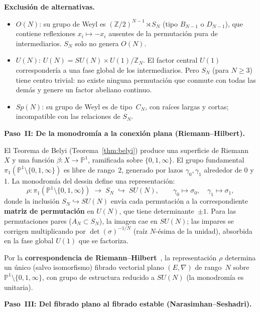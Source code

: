 \documentclass[11pt, a4paper, openany]{book}
\begin{document}
\smallskip\noindent
\textbf{Exclusi\'on de alternativas.}
\begin{itemize}
  \item $O(N)$: su grupo de Weyl es $(\mathbb{Z}/2)^{N-1} \rtimes S_N$
    (tipo $B_{N-1}$ o $D_{N-1}$), que contiene reflexiones
    $x_i \mapsto -x_i$ ausentes de la permutaci\'on pura de
    intermediarios. $S_N$ solo no genera $O(N)$.
  \item $U(N)$: $U(N) = SU(N) \times U(1)/\mathbb{Z}_N$. El
    factor central $U(1)$ corresponder\'ia a una fase global de
    los intermediarios. Pero $S_N$ (para $N \geq 3$) tiene centro
    trivial: no existe ninguna permutaci\'on que conmute con todas
    las dem\'as y genere un factor abeliano continuo.
  \item $Sp(N)$: su grupo de Weyl es de tipo~$C_N$, con ra\'ices
    largas y cortas; incompatible con las relaciones de $S_N$.
\end{itemize}

\medskip\noindent
\textbf{Paso~II: De la monodrom\'ia a la conexi\'on plana
(Riemann--Hilbert).}

El Teorema de Belyi (Teorema~\ref{thm:belyi}) produce una superficie
de Riemann~$X$ y una funci\'on $\beta \colon X \to \mathbb{P}^1$,
ramificada sobre $\{0, 1, \infty\}$. El grupo fundamental
$\pi_1(\mathbb{P}^1 \setminus \{0, 1, \infty\})$ es libre de
rango~2, generado por lazos $\gamma_0, \gamma_1$ alrededor de $0$ y
$1$. La monodrom\'ia del dessin define una representaci\'on:
\[
  \rho \colon \pi_1(\mathbb{P}^1 \setminus \{0, 1, \infty\})
  \;\longrightarrow\; S_N
  \;\hookrightarrow\; SU(N),
  \qquad
  \gamma_0 \mapsto \sigma_0, \quad \gamma_1 \mapsto \sigma_1,
\]
donde la inclusi\'on $S_N \hookrightarrow SU(N)$ env\'ia cada
permutaci\'on a la correspondiente \textbf{matriz de permutaci\'on}
en $U(N)$, que tiene determinante~$\pm 1$. Para las permutaciones
pares ($A_N \subset S_N$), la imagen cae en $SU(N)$; las impares se
corrigen multiplicando por $\det(\sigma)^{-1/N}$ (ra\'iz $N$-\'esima
de la unidad), absorbida en la fase global $U(1)$ que se factoriza.

Por la \textbf{correspondencia de Riemann--Hilbert}~\cite{deligne1970},
la representaci\'on $\rho$ determina un \'unico (salvo isomorfismo)
fibrado vectorial plano $(E, \nabla)$ de rango~$N$ sobre
$\mathbb{P}^1 \setminus \{0, 1, \infty\}$, con grupo de estructura
reducido a $SU(N)$ (la monodrom\'ia es unitaria).

\medskip\noindent
\textbf{Paso~III: Del fibrado plano al fibrado estable
(Narasimhan--Seshadri).}
\end{document}
